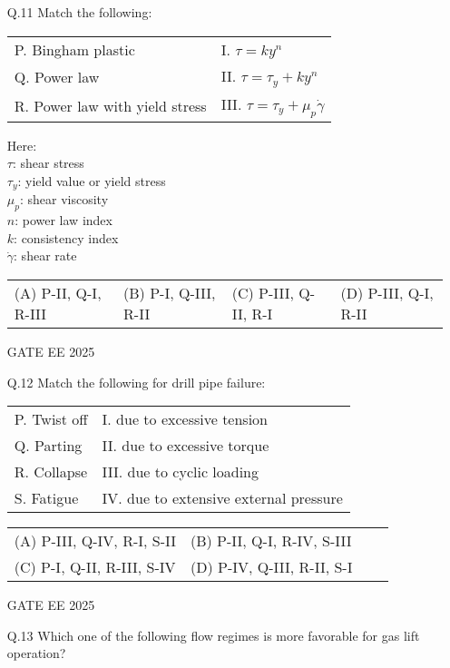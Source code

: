 \documentclass[journal]{IEEEtran}
\begin{document}
\begin{enumerate}[leftmargin=*]
\setcounter{enumi}{10} %

\item[Q.11] Match the following:

\begin{tabular}{ll}
P. Bingham plastic & I. $\tau = ky^n$ \\
Q. Power law & II. $\tau = \tau_y + ky^n$ \\
R. Power law with yield stress & III. $\tau = \tau_y + \mu_p \dot{\gamma}$ \\
\end{tabular}

Here: \\
$\tau$: shear stress \\
$\tau_y$: yield value or yield stress \\
$\mu_p$: shear viscosity \\
$n$: power law index \\
$k$: consistency index \\
$\dot{\gamma}$: shear rate \\

\begin{tabular}{llll}
(A) P-II, Q-I, R-III & (B) P-I, Q-III, R-II & (C) P-III, Q-II, R-I & (D) P-III, Q-I, R-II
\end{tabular}
GATE EE 2025
 \vspace{0.5cm} 
\item[Q.12] Match the following for drill pipe failure:

\begin{tabular}{ll}
P. Twist off & I. due to excessive tension \\
Q. Parting & II. due to excessive torque \\
R. Collapse & III. due to cyclic loading \\
S. Fatigue & IV. due to extensive external pressure \\
\end{tabular}

\begin{tabular}{llll}
(A) P-III, Q-IV, R-I, S-II & (B) P-II, Q-I, R-IV, S-III \\
(C) P-I, Q-II, R-III, S-IV & (D) P-IV, Q-III, R-II, S-I
\end{tabular}

GATE EE 2025
 \vspace{0.5cm} 
\item[Q.13] Which one of the following flow regimes is more favorable for gas lift operation?


\end{enumerate}
\end{document}
